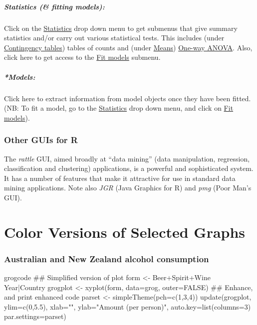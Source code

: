 \documentclass{tufte-book}\usepackage[]{graphicx}\usepackage[]{color}
\begin{document}
\paragraph{Statistics (\& fitting models):} Click on the
\underline{Statistics} drop down menu to get submenus that give
summary statistics and/or carry out various statistical tests.  This
includes (under \underline{Contingency tables}) tables of counts
and (under \underline{Means}) \underline{One-way ANOVA}.
Also, click here to get access to the \underline{Fit models} submenu.

\paragraph{*Models:} Click here to extract information from model
objects once they have been fitted.  (NB: To fit a model, go to the
\underline{Statistics} drop down menu, and click on \underline{Fit
  models}).

\subsection*{Other GUIs for R}

The {\em rattle} GUI, aimed broadly at ``data mining''  (data
manipulation, regression, classification and clustering) applications,
is a powerful and sophisticated system.  It has a number of features
that make it attractive for use in standard data mining applications.
Note also \textit{JGR} (Java Graphics for R) and \textit{pmg} (Poor
Man's GUI).
% 
\cleartooddpage

\chapter{Color Versions of Selected Graphs}\label{app:C}





\subsection*{Australian and New Zealand alcohol consumption}

\begin{SaveVerbatim}{grogcode}
## Simplified version of plot
form <-
  Beer+Spirit+Wine ~ Year|Country
grogplot <- xyplot(form, data=grog,
                   outer=FALSE)
## Enhance, and print enhanced code
parset <- simpleTheme(pch=c(1,3,4))
update(grogplot, ylim=c(0,5.5),
       xlab="",
       ylab="Amount (per person)",
       auto.key=list(columns=3)
       par.settings=parset)
\end{SaveVerbatim}
\end{document}
